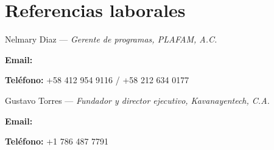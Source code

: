 \documentclass[xcolor=svgnames,color=DarkSlateGray]{komacv}
\begin{document}
\section{Referencias laborales}
        \begin{compactdesc}
                \item{Nelmary Diaz — }{\em Gerente de programas, PLAFAM, A.C.}
                \item{\bfseries Email:} 
                \item{\bfseries Teléfono:} +58 412 954 9116 / +58 212 634 0177
        \end{compactdesc}

\medskip

        \begin{compactdesc}
                \item{Gustavo Torres — }{\em Fundador y director ejecutivo, Kavanayentech, C.A.}
                \item{\bfseries Email:} 
                \item{\bfseries Teléfono:} +1 786 487 7791
        \end{compactdesc}
\end{document}
